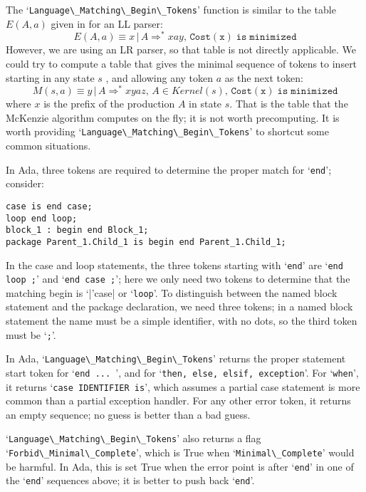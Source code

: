 \documentclass{article}
\newcommand{\code}[1]{`\lstinline|#1|'}
\begin{document}
The \code{Language\_Matching\_Begin\_Tokens} function is similar to the
table $E(A,a)$ given in \cite{FMQ 1980} for an LL parser:
\begin{equation}
E(A,a) \equiv x \, | \, A \Rightarrow^* xay, \, \mathtt{Cost(x)\; is\; minimized}
\end{equation}
However, we are using an LR parser, so that table is not directly
applicable. We could try to compute a table that gives the minimal
sequence of tokens to insert starting in any state $s$ , and
allowing any token $a$ as the next token:
\begin{equation}
M(s,a) \equiv y \, | \, A \Rightarrow^* xyaz, \, A \in Kernel(s), \, \mathtt{Cost(x)\; is\; minimized}
\end{equation}
where $x$ is the prefix of the production $A$ in state $s$.
That is the table that the McKenzie algorithm computes on the fly; it
is not worth precomputing. It is worth providing
\code{Language\_Matching\_Begin\_Tokens} to shortcut some common
situations.

In Ada, three tokens are required to determine the proper match for
\code{end}; consider:
\begin{lstlisting}
case is end case;
loop end loop;
block_1 : begin end Block_1;
package Parent_1.Child_1 is begin end Parent_1.Child_1;
\end{lstlisting}
In the case and loop statements, the three tokens starting with
\code{end} are \code{end loop ;} and \code{end case ;}; here we only
need two tokens to determine that the matching begin is \code|case| or
\code{loop}.
To distinguish between the named block statement and the package
declaration, we need three tokens; in a named block statement the name
must be a simple identifier, with no dots, so the third token must be
\code{;}.

In Ada, \code{Language\_Matching\_Begin\_Tokens} returns the proper
statement start token for \code{end ... }, and for
\code{then, else, elsif, exception}. For \code{when}, it returns
\code{case IDENTIFIER is}, which assumes a partial case statement is
more common than a partial exception handler. For any other error
token, it returns an empty sequence; no guess is better than a bad
guess.

\code{Language\_Matching\_Begin\_Tokens} also returns a flag
\code{Forbid\_Minimal\_Complete}, which is True when
\code{Minimal\_Complete} would be harmful. In Ada, this is set True
when the error point is after \code{end} in one of the \code{end}
sequences above; it is better to push back \code{end}.
\end{document}
